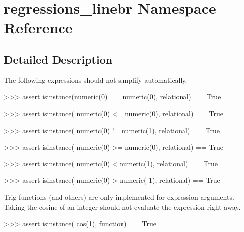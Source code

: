 \hypertarget{namespaceregressions__linebr}{}\section{regressions\+\_\+linebr Namespace Reference}
\label{namespaceregressions__linebr}


\subsection{Detailed Description}
\begin{DoxyVerb}The following expressions should not simplify automatically.

>>> assert isinstance(numeric(0) == numeric(0), relational) == True

>>> assert isinstance( numeric(0) <= numeric(0), relational) == True

>>> assert isinstance( numeric(0) != numeric(1), relational) == True

>>> assert isinstance( numeric(0) >= numeric(0), relational) == True

>>> assert isinstance( numeric(0) < numeric(1), relational) == True

>>> assert isinstance( numeric(0) > numeric(-1), relational) == True

Trig functions (and others) are only implemented for expression arguments.
Taking the cosine of an integer should not evaluate the expression right
away.

>>> assert isinstance( cos(1), function) == True\end{DoxyVerb}
 
